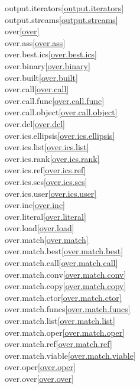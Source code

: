 \begin{multicols}{2}
output.iterators\quad\ref{output.iterators}\\
output.streams\quad\ref{output.streams}\\
over\quad\ref{over}\\
over.ass\quad\ref{over.ass}\\
over.best.ics\quad\ref{over.best.ics}\\
over.binary\quad\ref{over.binary}\\
over.built\quad\ref{over.built}\\
over.call\quad\ref{over.call}\\
over.call.func\quad\ref{over.call.func}\\
over.call.object\quad\ref{over.call.object}\\
over.dcl\quad\ref{over.dcl}\\
over.ics.ellipsis\quad\ref{over.ics.ellipsis}\\
over.ics.list\quad\ref{over.ics.list}\\
over.ics.rank\quad\ref{over.ics.rank}\\
over.ics.ref\quad\ref{over.ics.ref}\\
over.ics.scs\quad\ref{over.ics.scs}\\
over.ics.user\quad\ref{over.ics.user}\\
over.inc\quad\ref{over.inc}\\
over.literal\quad\ref{over.literal}\\
over.load\quad\ref{over.load}\\
over.match\quad\ref{over.match}\\
over.match.best\quad\ref{over.match.best}\\
over.match.call\quad\ref{over.match.call}\\
over.match.conv\quad\ref{over.match.conv}\\
over.match.copy\quad\ref{over.match.copy}\\
over.match.ctor\quad\ref{over.match.ctor}\\
over.match.funcs\quad\ref{over.match.funcs}\\
over.match.list\quad\ref{over.match.list}\\
over.match.oper\quad\ref{over.match.oper}\\
over.match.ref\quad\ref{over.match.ref}\\
over.match.viable\quad\ref{over.match.viable}\\
over.oper\quad\ref{over.oper}\\
over.over\quad\ref{over.over}\\

\end{multicols}
